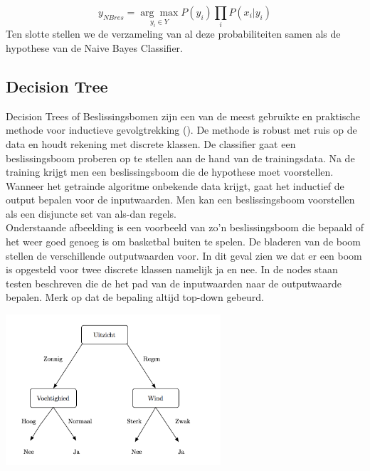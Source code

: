  \[y_{NBres} = \underset{y_i \in Y}{\arg\max} P(y_{i})\prod\limits_{i} P(x_{i}|y_{i}) \]
%
Ten slotte stellen we de verzameling van al deze probabiliteiten samen als de hypothese van de Naive Bayes Classifier.

\subsection{Decision Tree}\label{Decision Tree}
%
Decision Trees of Beslissingsbomen zijn een van de meest gebruikte en praktische methode voor inductieve gevolgtrekking (\cite{mitchell1997machine}). De methode is robust met ruis op de data en houdt rekening met discrete klassen. De classifier gaat een beslissingsboom proberen op te stellen aan de hand van de trainingsdata. Na de training krijgt men een beslissingsboom die de hypothese moet voorstellen. Wanneer het getrainde algoritme onbekende data krijgt, gaat het inductief de output bepalen voor de inputwaarden. Men kan een beslissingsboom voorstellen als een disjuncte set van als-dan regels.\\ 
%
Onderstaande afbeelding is een voorbeeld van zo'n beslissingsboom die bepaald of het weer goed genoeg is om basketbal buiten te spelen. De bladeren van de boom stellen de verschillende outputwaarden voor. In dit geval zien we dat er een boom is opgesteld voor twee discrete klassen namelijk ja en nee. In de nodes staan testen beschreven die de het pad van de inputwaarden naar de outputwaarde bepalen. Merk op dat de bepaling altijd top-down gebeurd.
%
\begin{center}
  \includegraphics[width=8cm]{decisiontree}
  \label{fig:beslissingsboom}
\end{center}
